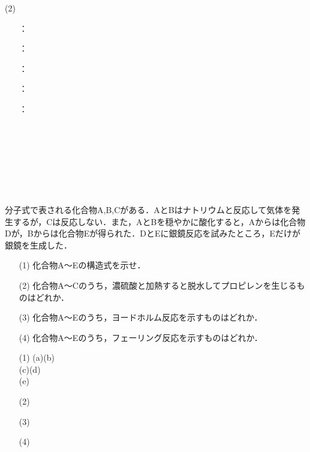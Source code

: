 \documentclass[a4paper,12pt]{ltjsreport}
\begin{document}
\begin{minipage}{0.5\linewidth}
\noindent (2)
\begin{itemize}
    \item[\fbox{コ}]：\\
      \item [\fbox{サ}]：\\
  \item [\fbox{シ}]：\\
  \item [\fbox{ス}]：\\
    \item [　]：\\
  \item [　]　\\
  \item [　]　\\
  \item [　]　\\
  \item [　]　
\end{itemize}
\end{minipage}
\newpage
\begin{que}
分子式で表される化合物A,B,Cがある．AとBはナトリウムと反応して気体を発生するが，Cは反応しない．また，AとBを穏やかに酸化すると，Aからは化合物Dが，Bからは化合物Eが得られた．DとEに銀鏡反応を試みたところ，Eだけが銀鏡を生成した．
\begin{itemize}
    \item [(1)]化合物A〜Eの構造式を示せ．
    \item [(2)]化合物A〜Cのうち，濃硫酸と加熱すると脱水してプロピレンを生じるものはどれか．
    \item [(3)]化合物A〜Eのうち，ヨードホルム反応を示すものはどれか．
    \item [(4)]化合物A〜Eのうち，フェーリング反応を示すものはどれか．
\end{itemize}
\end{que}
\ans 
\begin{itemize}
    \item[(1)](a)\hspace{180pt}(b)\\[70pt]
         (c)\hspace{180pt}(d)\\[70pt]
            (e)\\
    \item[(2)]　\\[20pt]
    \item[(3)]　\\[20pt]
    \item[(4)]　\\[20pt]
\end{itemize}
\end{document}
